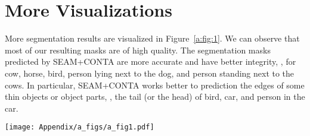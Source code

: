  \begin{table}[t]
\centering
\renewcommand\arraystretch{1.3}
\vspace{3mm}
\caption{Ablation results of SEC~\cite{kolesnikov2016seed}+CONTA on MS-COCO~\cite{lin2014microsoft} in mIoU (\%). ``*'' denotes our re-implemented results. ``Seg. Mask'' refers to the segmentation mask of the \emph{val} set. ``--'' denotes that the result is N.A. for the fully-supervised model.}
\label{a:tab:7}
\end{table}
%
 \section{More Visualizations}\label{sec:a5}
{\color{red}{This is Appendix to Section 4.4 ``Comparison with State-of-the-arts''.}}
More segmentation results are visualized in Figure~\ref{a:fig:1}. We can observe that most of our resulting masks are of high quality. The segmentation masks predicted by SEAM+CONTA are more accurate and have better integrity, \eg, for cow, horse, bird, person lying next to the dog, and person standing next to the cows. In particular, SEAM+CONTA works better to prediction the edges of some thin objects or object parts, \eg, the tail (or the head) of bird, car, and person in the car.
\begin{figure*}[t]
\centering
\texttt{[image: Appendix/a\_figs/a\_fig1.pdf]}
\caption{More visualization results. Samples are from PASCAL VOC 2012~\cite{everingham2015pascal}. Red rectangles highlight the improved regions predicted by SEAM~\cite{wang2020self}+CONTA.}
\label{a:fig:1}
\end{figure*}
